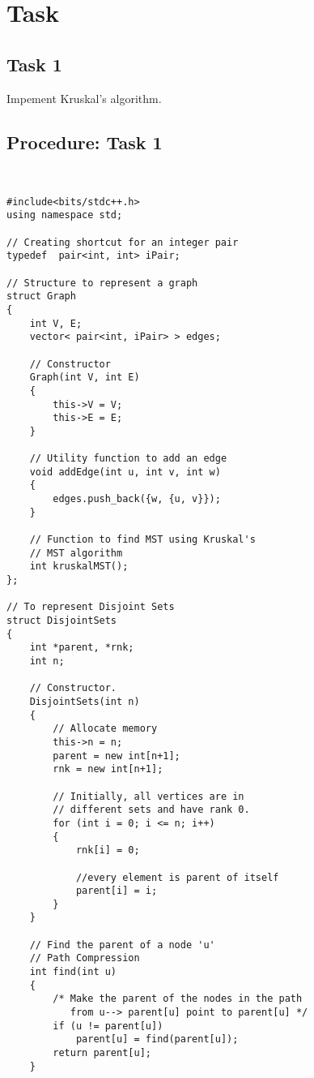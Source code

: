 \documentclass[11pt]{article}            %
\begin{document}
\section{Task}  

\subsection{ Task 1 }     

Impement Kruskal's algorithm.

\subsection{Procedure: Task 1 }    
 

\begin{lstlisting}


#include<bits/stdc++.h>
using namespace std;
 
// Creating shortcut for an integer pair
typedef  pair<int, int> iPair;
 
// Structure to represent a graph
struct Graph
{
    int V, E;
    vector< pair<int, iPair> > edges;
 
    // Constructor
    Graph(int V, int E)
    {
        this->V = V;
        this->E = E;
    }
 
    // Utility function to add an edge
    void addEdge(int u, int v, int w)
    {
        edges.push_back({w, {u, v}});
    }
 
    // Function to find MST using Kruskal's
    // MST algorithm
    int kruskalMST();
};
 
// To represent Disjoint Sets
struct DisjointSets
{
    int *parent, *rnk;
    int n;
 
    // Constructor.
    DisjointSets(int n)
    {
        // Allocate memory
        this->n = n;
        parent = new int[n+1];
        rnk = new int[n+1];
 
        // Initially, all vertices are in
        // different sets and have rank 0.
        for (int i = 0; i <= n; i++)
        {
            rnk[i] = 0;
 
            //every element is parent of itself
            parent[i] = i;
        }
    }
 
    // Find the parent of a node 'u'
    // Path Compression
    int find(int u)
    {
        /* Make the parent of the nodes in the path
           from u--> parent[u] point to parent[u] */
        if (u != parent[u])
            parent[u] = find(parent[u]);
        return parent[u];
    }
 

\end{lstlisting}
\end{document}
